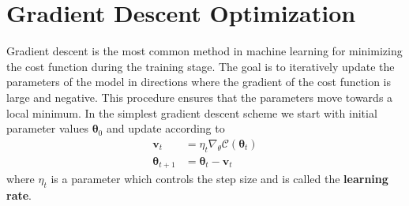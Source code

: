 \documentclass[twoside,english]{uiofysmaster}
\begin{document}
\section{Gradient Descent Optimization}
\label{sec:GD}
Gradient descent is the most common method in machine learning for minimizing the cost function during the training stage. The goal is to iteratively update the parameters of the model in directions where the gradient of the cost function is large and negative. This procedure ensures that the parameters move towards a local minimum. In the simplest gradient descent scheme we start with initial parameter values  $\bm{\theta}_0$ and update according to
\begin{align}
	\mathbf{v}_t &= \eta_t \nabla_\theta \mathcal{C}(\bm{\theta}_t) \\
	\bm{\theta}_{t+1} &= \bm{\theta}_t - \mathbf{v}_t 	
\end{align}
where $\eta_t$ is a parameter which controls the step size and is called the \textbf{learning rate}.
\end{document}
